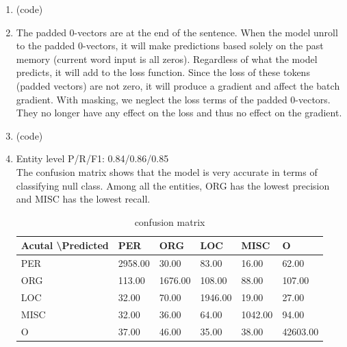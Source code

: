 \documentclass[10pt]{article}
\begin{document}
\begin{enumerate}[label=(\alph*)]
\item
(code)

\item
The padded 0-vectors are at the end of the sentence.
When the model unroll to the padded 0-vectors, it will make predictions based solely on the past memory (current word input is all zeros).
Regardless of what the model predicts, it will add to the loss function.
Since the loss of these tokens (padded vectors) are not zero, it will produce a gradient and affect the batch gradient.
With masking, we neglect the loss terms of the padded 0-vectors. They no longer have any effect on the loss and thus no effect on the gradient.\\

\item
(code)

\item
Entity level P/R/F1: 0.84/0.86/0.85\\
The confusion matrix shows that the model is very accurate in terms of classifying null class. Among all the entities,  ORG has the lowest precision and MISC has the lowest recall.
\begin{table}[h]
	\centering
	\caption{confusion matrix}
	\begin{tabular}{|l|l|l|l|l|l|}
	\hline
	Acutal \textbackslash Predicted & PER     & ORG     & LOC     & MISC    & O        \\ \hline
	PER   & 2958.00 & 30.00   & 83.00   & 16.00   & 62.00    \\ \hline
	ORG   & 113.00  & 1676.00 & 108.00   & 88.00   & 107.00   \\ \hline
	LOC   & 32.00   & 70.00  & 1946.00 & 19.00   & 27.00    \\ \hline
	MISC  & 32.00   & 36.00   & 64.00   & 1042.00 & 94.00   \\ \hline
	O     & 37.00   & 46.00   & 35.00   & 38.00   & 42603.00 \\ \hline
	\end{tabular}
\end{table}


\end{enumerate}
\end{document}
